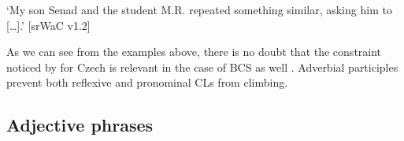 \begin{exe}
\ex
\begin{xlist}
\end{xlist}
\glt ‘My son Senad and the student M.R. repeated something similar, asking him {to [\dots].’}
\hfill [srWaC v1.2]
\end{exe}

\noindent As we can see from the examples above, there is no doubt that the constraint noticed by \citet{Junghanns02} for Czech is relevant in the case of BCS as well \citep[cf.][447]{CavarWilder94}. Adverbial participles prevent both reflexive and pronominal CLs from climbing.

\subsection{Adjective phrases}
\label{Adjective phrases}

